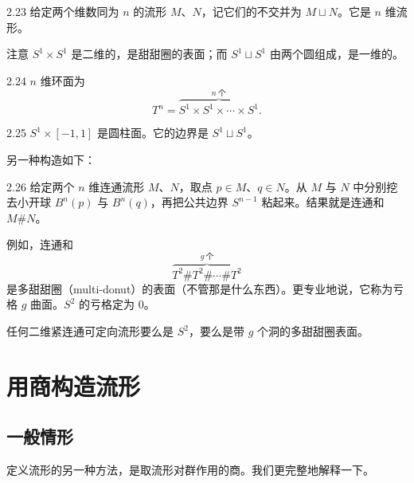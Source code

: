 \begin{notation}{2.23}
给定两个维数同为 $n$ 的流形 $M$、$N$，记它们的不交并为 $M\sqcup N$。它是 $n$ 维流形。
\end{notation}

注意 $S^1\times S^1$ 是二维的，是甜甜圈的表面；而 $S^1\sqcup S^1$ 由两个圆组成，是一维的。

\begin{example}{2.24}
$n$ 维环面为
\begin{equation}
T^n=\overbrace{S^1\times S^1\times\cdots\times S^1}^{n\ \text{个}}. \tag{2.27}
\end{equation}
\end{example}

\begin{example}{2.25}
$S^1\times[-1,1]$ 是圆柱面。它的边界是 $S^1\sqcup S^1$。
\end{example}

另一种构造如下：

\begin{notation}{2.26}
给定两个 $n$ 维连通流形 $M$、$N$，取点 $p\in M$、$q\in N$。从 $M$ 与 $N$ 中分别挖去小开球 $B^n(p)$ 与 $B^n(q)$，再把公共边界 $S^{n-1}$ 粘起来。结果就是连通和 $M\#N$。
\end{notation}

例如，连通和
\begin{equation}
\overbrace{T^2\#T^2\#\cdots\#T^2}^{g\ \text{个}} \tag{2.28}
\end{equation}
是多甜甜圈（multi-donut）的表面（不管那是什么东西）。更专业地说，它称为亏格 $g$ 曲面。$S^2$ 的亏格定为 0。

\begin{qmbox}
任何二维紧连通可定向流形要么是 $S^2$，要么是带 $g$ 个洞的多甜甜圈表面。
\end{qmbox}


\section{用商构造流形}

\subsection{一般情形}

定义流形的另一种方法，是取流形对群作用的商。我们更完整地解释一下。

